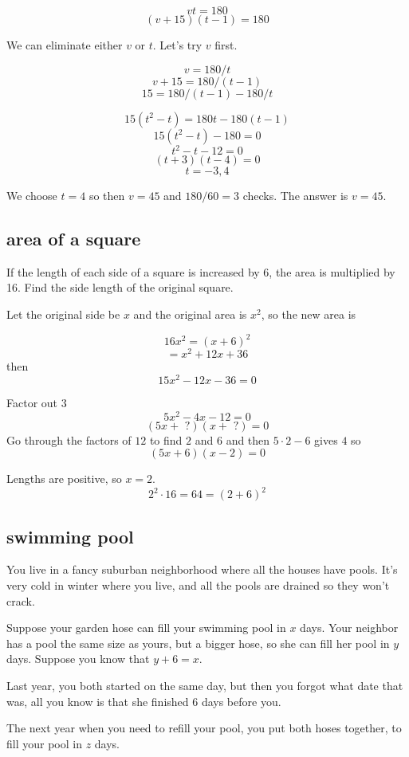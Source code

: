 \documentclass[11pt, oneside]{article}
\begin{document}
\[ vt = 180 \]
\[ (v + 15)(t - 1) = 180 \]

We can eliminate either $v$ or $t$.  Let's try $v$ first.

\[ v = 180/t \]
\[ v + 15 = 180/(t-1) \]
\[ 15 = 180/(t-1) - 180/t \]

\[ 15(t^2 - t) = 180t - 180(t-1) \]
\[ 15(t^2 - t) - 180 = 0 \]
\[ t^2 - t - 12 = 0 \]
\[ (t + 3)(t - 4) = 0 \]
\[ t = -3,4 \]

We choose $t = 4$ so then $v = 45$ and $180/60 = 3$ checks.
The answer is $v = 45$.

\subsection*{area of a square}

If the length of each side of a square is increased by 6, the area is multiplied by 16. Find the side length of the original square.

Let the original side be $x$ and the original area is $x^2$, so the new area is 

\[ 16x^2 = (x + 6)^2 \]
 \[      = x^2 + 12x + 36 \]
then
\[ 15x^2 - 12x - 36 = 0 \]

Factor out $3$
\[ 5x^2 - 4x - 12 = 0 \]
\[ (5x + \text{ ?})(x + \text{ ?}) = 0 \]
Go through the factors of $12$ to find $2$ and $6$ and then $5 \cdot 2 - 6$ gives $4$ so
\[ (5x + 6)(x - 2) = 0 \]

Lengths are positive, so $x = 2$.
\[ 2^2 \cdot 16 = 64 = (2 + 6)^2  \]

\subsection*{swimming pool}

You live in a fancy suburban neighborhood where all the houses have pools.  It's very cold in winter where you live, and all the pools are drained so they won't crack.

Suppose your garden hose can fill your swimming pool in $x$ days.  Your neighbor has a pool the same size as yours, but a bigger hose, so she can fill her pool in $y$ days.  Suppose you know that $y + 6 = x$.  

Last year, you both started on the same day, but then you forgot what date that was, all you know is that she finished 6 days before you.

The next year when you need to refill your pool, you put both hoses together, to fill your pool in $z$ days.
\end{document}
